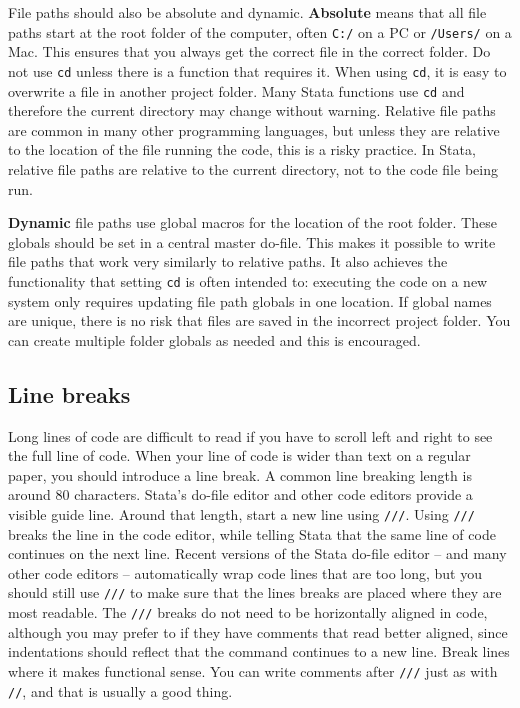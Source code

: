 File paths should also be absolute and dynamic.
\textbf{Absolute} means that all
file paths start at the root folder of the computer,
often \texttt{C:/} on a PC or \texttt{/Users/} on a Mac.
This ensures that you always get the correct file in the correct folder.
Do not use \texttt{cd} unless there is a function that requires it.
When using \texttt{cd}, it is easy to overwrite a file in another project folder.
Many Stata functions use \texttt{cd} and therefore the current directory may change without warning.
Relative file paths are common in many other programming languages,
but unless they are relative to the location of the file running the code,
this is a risky practice.
In Stata, relative file paths are relative to the current directory,
not to the code file being run.

\textbf{Dynamic} file paths use global macros for the location of the root folder.
These globals should be set in a central master do-file.
This makes it possible to write file paths that work very similarly to relative paths.
It also achieves the functionality that setting \texttt{cd} is often intended to:
executing the code on a new system only requires updating file path globals in one location.
If global names are unique, there is no risk that files are saved in the incorrect project folder.
You can create multiple folder globals as needed and this is encouraged.


\subsection{Line breaks}

Long lines of code are difficult to read if you have to scroll left and right to see the full line of code.
When your line of code is wider than text on a regular paper, you should introduce a line break.
A common line breaking length is around 80 characters.
Stata's do-file editor and other code editors provide a visible guide line.
Around that length, start a new line using \texttt{///}.
Using \texttt{///} breaks the line in the code editor,
while telling Stata that the same line of code continues on the next line.
Recent versions of the Stata do-file editor --
and many other code editors --
automatically wrap code lines that are too long,
but you should still use \texttt{///}
to make sure that the lines breaks are placed
where they are most readable.
The \texttt{///} breaks do not need to be horizontally aligned in code,
although you may prefer to if they have comments that read better aligned,
since indentations should reflect that the command continues to a new line.
Break lines where it makes functional sense.
You can write comments after \texttt{///} just as with \texttt{//}, and that is usually a good thing.


